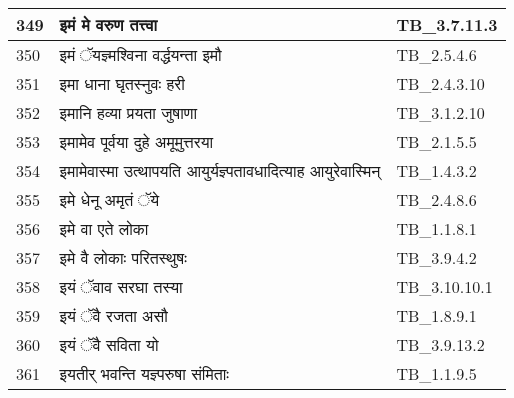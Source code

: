 \documentclass[17pt]{extarticle}
\begin{document}
\begin{longtable}{||p{0.4in}||p{4.9in}||p{0.9in}||}
    \hline
        
    349 & इमं मे वरुण तत्त्वा & TB\_3.7.11.3       \\
    
    \hline
        
    350 & इमं ॅयज्ञ्मश्विना वर्द्धयन्ता इमौ & TB\_2.5.4.6       \\
    
    \hline
        
    351 & इमा धाना घृतस्नुवः हरी & TB\_2.4.3.10       \\
    
    \hline
        
    352 & इमानि हव्या प्रयता जुषाणा & TB\_3.1.2.10       \\
    
    \hline
        
    353 & इमामेव पूर्वया दुहे अमूमुत्तरया & TB\_2.1.5.5       \\
    
    \hline
        
    354 & इमामेवास्मा उत्थापयति आयुर्यज्ञ्पतावधादित्याह आयुरेवास्मिन् & TB\_1.4.3.2       \\
    
    \hline
        
    355 & इमे धेनू अमृतं ॅये & TB\_2.4.8.6       \\
    
    \hline
        
    356 & इमे वा एते लोका & TB\_1.1.8.1       \\
    
    \hline
        
    357 & इमे वै लोकाः परितस्थुषः & TB\_3.9.4.2       \\
    
    \hline
        
    358 & इयं ॅवाव सरघा तस्या & TB\_3.10.10.1       \\
    
    \hline
        
    359 & इयं ॅवै रजता असौ & TB\_1.8.9.1       \\
    
    \hline
        
    360 & इयं ॅवै सविता यो & TB\_3.9.13.2       \\
    
    \hline
        
    361 & इयतीर् भवन्ति यज्ञ्परुषा संमिताः & TB\_1.1.9.5       \\
    

\end{longtable}
\end{document}
